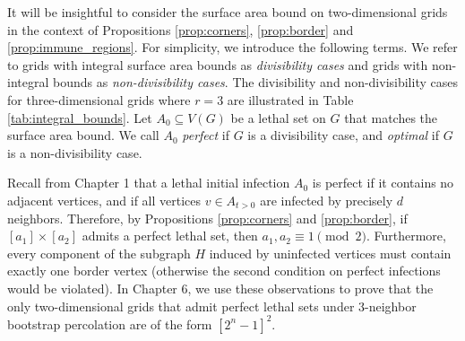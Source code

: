 It will be insightful to consider the surface area bound on two-dimensional grids in the context of Propositions \ref{prop:corners}, \ref{prop:border} and \ref{prop:immune_regions}. For simplicity, we introduce the following terms. We refer to grids with integral surface area bounds as \emph{divisibility cases} and grids with non-integral bounds as \emph{non-divisibility cases}. The divisibility and non-divisibility cases for three-dimensional grids where $r=3$ are illustrated in Table \ref{tab:integral_bounds}. Let $A_0 \subseteq V(G)$ be a lethal set on $G$ that matches the surface area bound. We call $A_0$ \emph{perfect} if $G$ is a divisibility case, and \emph{optimal} if $G$ is a non-divisibility case. 

Recall from Chapter 1 that a lethal initial infection $A_0$ is perfect if it contains no adjacent vertices, and if all vertices $v \in A_{t > 0}$ are infected by precisely $d$ neighbors. Therefore, by Propositions \ref{prop:corners} and \ref{prop:border}, if  $[a_1] \times [a_2]$ admits a perfect lethal set, then $a_1, a_2 \equiv 1 \pmod 2$. Furthermore, every component of the subgraph $H$ induced by uninfected vertices must contain exactly one border vertex (otherwise the second condition on perfect infections would be violated). In Chapter 6, we use these observations to prove that the only two-dimensional grids that admit perfect lethal sets under 3-neighbor bootstrap percolation are of the form $[2^n-1]^2$.


